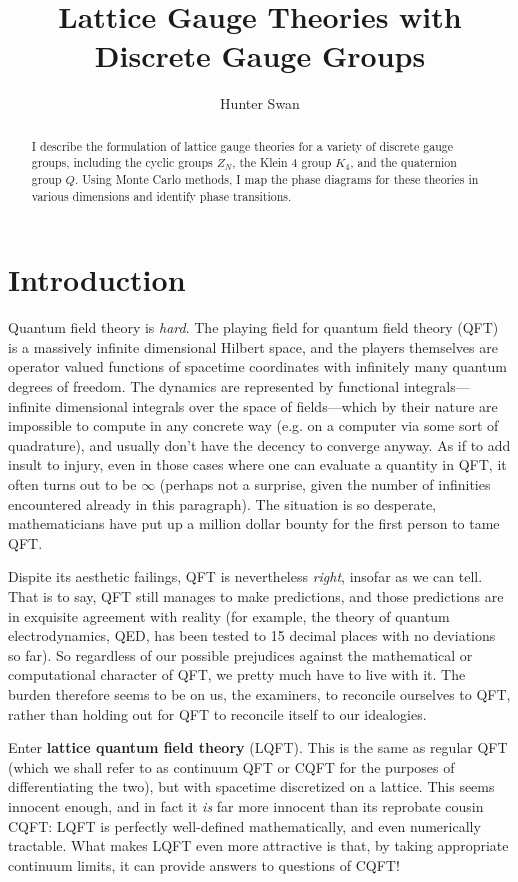 \documentclass[9pt,twocolumn,twoside]{article}
\begin{document}
\title{Lattice Gauge Theories with Discrete Gauge Groups}
\author{Hunter Swan}

\maketitle
\begin{abstract}
I describe the formulation of lattice gauge theories for a variety of discrete gauge groups, including the cyclic groups $Z_N$, the Klein 4 group $K_4$, and the quaternion group $Q$.  Using Monte Carlo methods, I map the phase diagrams for these theories in various dimensions and identify phase transitions.
\end{abstract}

\section{Introduction}
Quantum field theory is \textit{hard}.  The playing field for quantum field theory (QFT) is a massively infinite dimensional Hilbert space, and the players themselves are operator valued functions of spacetime coordinates with infinitely many quantum degrees of freedom.  The dynamics are represented by functional integrals---infinite dimensional integrals over the space of fields---which by their nature are impossible to compute in any concrete way (e.g. on a computer via some sort of quadrature), and usually don't have the decency to converge anyway.  As if to add insult to injury, even in those cases where one can evaluate a quantity in QFT, it often turns out to be $\infty$ (perhaps not a surprise, given the number of infinities encountered already in this paragraph).  The situation is so desperate, mathematicians have put up a million dollar bounty for the first person to tame QFT.

Dispite its aesthetic failings, QFT is nevertheless \textit{right}, insofar as we can tell.  That is to say, QFT still manages to make predictions, and those predictions are in exquisite agreement with reality (for example, the theory of quantum electrodynamics, QED, has been tested to 15 decimal places with no deviations so far).  So regardless of our possible prejudices against the mathematical or computational character of QFT, we pretty much have to live with it.  The burden therefore seems to be on us, the examiners, to reconcile ourselves to QFT, rather than holding out for QFT to reconcile itself to our idealogies.  

Enter \textbf{lattice quantum field theory} (LQFT).  This is the same as regular QFT (which we shall refer to as continuum QFT or CQFT for the purposes of differentiating the two), but with spacetime discretized on a lattice.  This seems innocent enough, and in fact it \textit{is} far more innocent than its reprobate cousin CQFT: LQFT is perfectly well-defined mathematically, and even numerically tractable.  What makes LQFT even more attractive is that, by taking appropriate continuum limits, it can provide answers to questions of CQFT!
\end{document}
